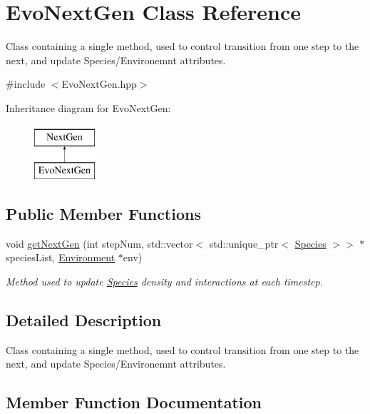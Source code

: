 \hypertarget{classEvoNextGen}{}\section{Evo\+Next\+Gen Class Reference}
\label{classEvoNextGen}


Class containing a single method, used to control transition from one step to the next, and update Species/\+Environemnt attributes.  




{\ttfamily \#include $<$Evo\+Next\+Gen.\+hpp$>$}

Inheritance diagram for Evo\+Next\+Gen\+:\begin{figure}[H]
\begin{center}
\leavevmode
\includegraphics[height=2.000000cm]{classEvoNextGen}
\end{center}
\end{figure}
\subsection*{Public Member Functions}
\begin{DoxyCompactItemize}
\item 
void \hyperlink{classEvoNextGen_af9ee37c63b6b2c22d27194b6b507c75a}{get\+Next\+Gen} (int step\+Num, std\+::vector$<$ std\+::unique\+\_\+ptr$<$ \hyperlink{classSpecies}{Species} $>$$>$ $\ast$species\+List, \hyperlink{classEnvironment}{Environment} $\ast$env)
\begin{DoxyCompactList}\small\item\em Method used to update \hyperlink{classSpecies}{Species} density and interactions at each timestep. \end{DoxyCompactList}\end{DoxyCompactItemize}


\subsection{Detailed Description}
Class containing a single method, used to control transition from one step to the next, and update Species/\+Environemnt attributes. 

\subsection{Member Function Documentation}
\hypertarget{classEvoNextGen_af9ee37c63b6b2c22d27194b6b507c75a}{}\label{classEvoNextGen_af9ee37c63b6b2c22d27194b6b507c75a} 
